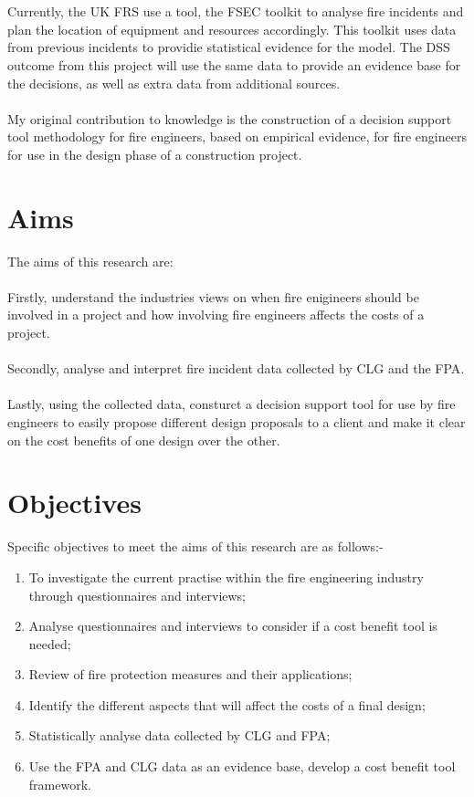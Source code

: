 \documentclass[table,a4paper,oneside]{book}
\begin{document}
\\
\\
Currently, the UK \ac{FRS} use a tool, the \ac{FSEC} toolkit to analyse fire incidents and plan the location of equipment and resources accordingly. This toolkit uses data from previous incidents to providie statistical evidence for the model. The \ac{DSS} outcome from this project will use the same data to provide an evidence base for the decisions, as well as extra data from additional sources.
\\
\\
My original contribution to knowledge is the construction of a decision support tool methodology for fire engineers, based on empirical evidence, for fire engineers for use in the design phase of a construction project.

\section{Aims}
\label{sec:Aims}
The aims of this research are:
\\
\\
Firstly, understand the industries views on when fire enigineers should be involved in a project and how involving fire engineers affects the costs of a project.
\\
\\
Secondly, analyse and interpret fire incident data collected by \ac{CLG} and the \ac{FPA}.
\\
\\
Lastly, using the collected data, consturct a decision support tool for use by fire engineers to easily propose different design proposals to a client and make it clear on the cost benefits of one design over the other.

\section{Objectives}
\label{sec:Objectives}
Specific objectives to meet the aims of this research are as follows:-

\begin{enumerate}
	\item To investigate the current practise within the fire engineering industry through questionnaires and interviews;
	\item Analyse questionnaires and interviews to consider if a cost benefit tool is needed;
	\item Review of fire protection measures and their applications;
	\item Identify the different aspects that will affect the costs of a final design;
	\item Statistically analyse data collected by \ac{CLG} and \ac{FPA};
	\item Use the \ac{FPA} and \ac{CLG} data as an evidence base, develop a cost benefit tool framework.
\end{enumerate}
\end{document}
